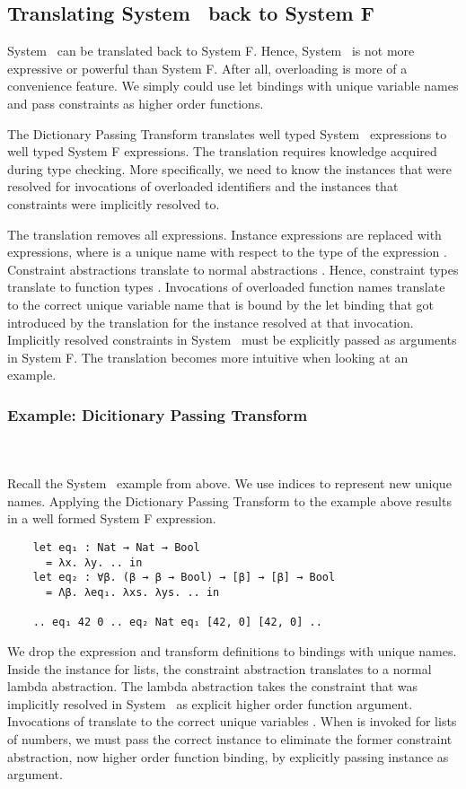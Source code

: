 \subsection{Translating System \Fo\ back to System F}
System \Fo\ can be translated back to System F. Hence, System \Fo\ is not more expressive or powerful than System F. After all, overloading is more of a convenience feature. We simply could use let bindings with unique variable names and pass constraints as higher order functions.

\noindent The Dictionary Passing Transform translates well typed System \Fo\ expressions to well typed System F expressions. The translation requires knowledge acquired during type checking. More specifically, we need to know the instances that were resolved for invocations of overloaded identifiers and the instances that constraints were implicitly resolved to.

\noindent The translation removes all  expressions. Instance expressions  are replaced with  expressions, where  is a unique name with respect to the type  of the expression . 
Constraint abstractions  translate to normal abstractions . 
Hence, constraint types  translate to function types . 
Invocations of overloaded function names  translate to the correct unique variable name  that is bound by the let binding that got introduced by the translation for the instance resolved at that invocation.
Implicitly resolved constraints in System \Fo\ must be explicitly passed as arguments in System F. The translation becomes more intuitive when looking at an example.

\subsubsection{Example: Dicitionary Passing Transform}\hfill\\\\
Recall the System \Fo\ example from above. We use indices to represent new unique names.
Applying the Dictionary Passing Transform to the example above results in a well formed System F expression.
\begin{verbatim}
    let eq₁ : Nat → Nat → Bool 
      = λx. λy. .. in
    let eq₂ : ∀β. (β → β → Bool) → [β] → [β] → Bool 
      = Λβ. λeq₁. λxs. λys. .. in
    
    .. eq₁ 42 0 .. eq₂ Nat eq₁ [42, 0] [42, 0] .. 
\end{verbatim}
We drop the \inl{|\Decl|}expression and transform \inl{|\Inst|}definitions to  bindings with unique names. 
Inside the instance for lists, the constraint abstraction translates to a normal lambda abstraction. The lambda abstraction takes the constraint that was implicitly resolved in System \Fo\ as explicit higher order function argument.
Invocations of  translate to the correct unique variables .
When  is invoked for lists of numbers, we must pass the correct instance to eliminate the former constraint abstraction, now higher order function binding, by explicitly passing instance  as argument.
